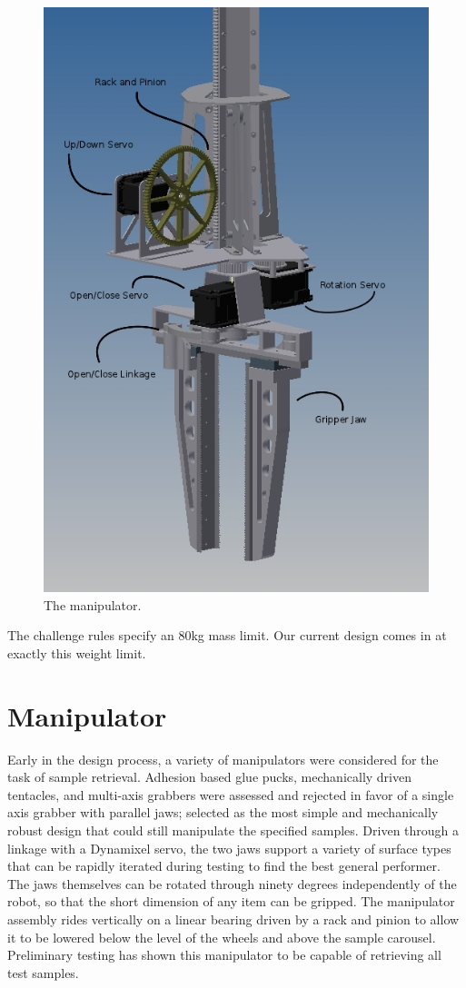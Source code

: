 \documentclass[12pt]{article}
\begin{document}
\begin{figure}[htbp]
\centering
\includegraphics[width=4.5in]{../assets/manipulator.jpg}
\caption{The manipulator.}
\label{fig_bot_manipulator}
\end{figure}

The challenge rules specify an 80kg mass limit. Our current design comes in at exactly this weight limit.

%
\section{Manipulator}\label{Manipulator}

Early in the design process, a variety of manipulators were considered for the task of sample retrieval. Adhesion based glue pucks, mechanically driven tentacles, and multi-axis grabbers were assessed and rejected in favor of a single axis grabber with parallel jaws; selected as the most simple and mechanically robust design that could still manipulate the specified samples. Driven through a linkage with a Dynamixel servo, the two jaws support a variety of surface types that can be rapidly iterated during testing to find the best general performer. The jaws themselves can be rotated through ninety degrees independently of the robot, so that the short dimension of any item can be gripped. The manipulator assembly rides vertically on a linear bearing driven by a rack and pinion to allow it to be lowered below the level of the wheels and above the sample carousel. Preliminary testing has shown this manipulator to be capable of retrieving all test samples.
\end{document}
